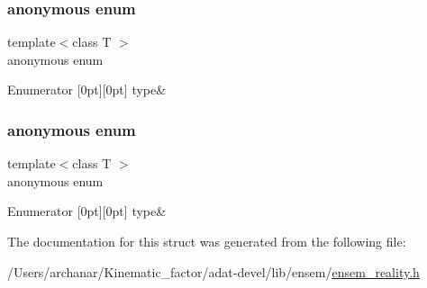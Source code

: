 \subsubsection{\texorpdfstring{anonymous enum}{anonymous enum}}
{\footnotesize\ttfamily template$<$class T $>$ \\
anonymous enum}

\begin{DoxyEnumFields}{Enumerator}
[0pt][0pt]{}\mbox{\label{structENSEM_1_1EnsbcIO_3_01RComplex_3_01T_01_4_01_4_a34e40c93f4ac747ab8127c925f144444a5b3708c9fa3a312e76feca278f14a7d3}} 
type&\\
\hline

\end{DoxyEnumFields}
\mbox{\label{structENSEM_1_1EnsbcIO_3_01RComplex_3_01T_01_4_01_4_a34e40c93f4ac747ab8127c925f144444}} 
\subsubsection{\texorpdfstring{anonymous enum}{anonymous enum}}
{\footnotesize\ttfamily template$<$class T $>$ \\
anonymous enum}

\begin{DoxyEnumFields}{Enumerator}
[0pt][0pt]{}\mbox{\label{structENSEM_1_1EnsbcIO_3_01RComplex_3_01T_01_4_01_4_a34e40c93f4ac747ab8127c925f144444a5b3708c9fa3a312e76feca278f14a7d3}} 
type&\\
\hline

\end{DoxyEnumFields}


The documentation for this struct was generated from the following file\+:\begin{DoxyCompactItemize}
\item 
/\+Users/archanar/\+Kinematic\+\_\+factor/adat-\/devel/lib/ensem/\mbox{\hyperlink{adat-devel_2lib_2ensem_2ensem__reality_8h}{ensem\+\_\+reality.\+h}}\end{DoxyCompactItemize}

